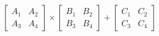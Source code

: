 \documentclass[preview]{standalone}
\begin{document}
\begin{align*}
\begin{bmatrix} A_1 & A_2 \\ A_3 & A_4 \end{bmatrix} \times \begin{bmatrix} B_1 & B_2 \\ B_3 & B_4 \end{bmatrix} + \begin{bmatrix} C_1 & C_2 \\ C_3 & C_4 \end{bmatrix}
\end{align*}
\end{document}
